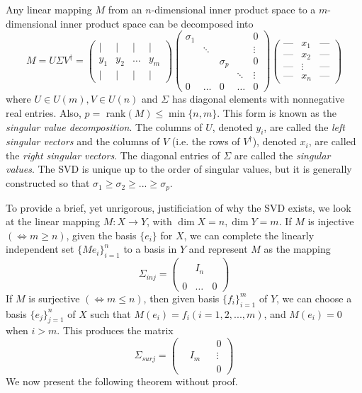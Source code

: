 \documentclass{article}
\begin{document}
    \begin{theorem}
    Any linear mapping $M$ from an $n$-dimensional inner product space to a $m$-dimensional inner product space can be decomposed into 
    \[ M = U \Sigma V^\dagger = \begin{pmatrix}
     \vert & \vert & \vert & \vert\\
    y_1 & y_2 & \ldots & y_m \\
    \vert & \vert & \vert & \vert
    \end{pmatrix}\begin{pmatrix}
    \sigma_1 & & & &0\\
    &\ddots &&& \vdots \\
    & & \sigma_p & & 0\\
    & & & \ddots &\vdots \\
    0 & \ldots &0& \ldots &0
    \end{pmatrix} \begin{pmatrix}
    \text{---}&x_1&\text{---} \\
    \text{---}&x_2&\text{---} \\
    \text{---}&\vdots&\text{---} \\
    \text{---}&x_n&\text{---}
    \end{pmatrix} \]
    where $U \in U(m), V \in U(n)$ and $\Sigma$ has diagonal elements with nonnegative real entries. Also, $p = $ rank$(M) \leq \min{\{n,m\}}$. This form is known as the \textit{singular value decomposition}. The columns of $U$, denoted $y_i$, are called the \textit{left singular vectors} and the columns of $V$ (i.e. the rows of $V^\dagger$), denoted $x_i$, are called the \textit{right singular vectors}. The diagonal entries of $\Sigma$ are called the \textit{singular values}. The SVD is unique up to the order of singular values, but it is generally constructed so that $\sigma_1 \geq \sigma_2 \geq ... \geq \sigma_p$. 
    \end{theorem}

    To provide a brief, yet unrigorous, justificiation of why the SVD exists, we look at the linear mapping $M: X \longrightarrow Y$, with $\dim{X} = n, \dim{Y} = m$. If $M$ is injective $(\iff m \geq n)$, given the basis $\{e_i\}$ for $X$, we can complete the linearly independent set $\{Me_i\}_{i=1}^n$ to a basis in $Y$ and represent $M$ as the mapping
    \[\Sigma_{inj} = \begin{pmatrix}
    &&\\
    &I_n&\\
    &&\\
    0&\ldots &0
    \end{pmatrix}\]
    If $M$ is surjective $(\iff m \leq n)$, then given basis $\{f_i\}_{i=1}^m$ of $Y$, we can choose a basis $\{e_j\}_{j=1}^n$ of $X$ such that $M(e_i) = f_i (i = 1, 2, ..., m)$, and $M(e_i) = 0$ when $i > m$. This produces the matrix
    \[\Sigma_{surj} = \begin{pmatrix}
    &&&0\\&I_m&& \vdots \\&&&0\end{pmatrix}\]
    We now present the following theorem without proof. 
\end{document}
